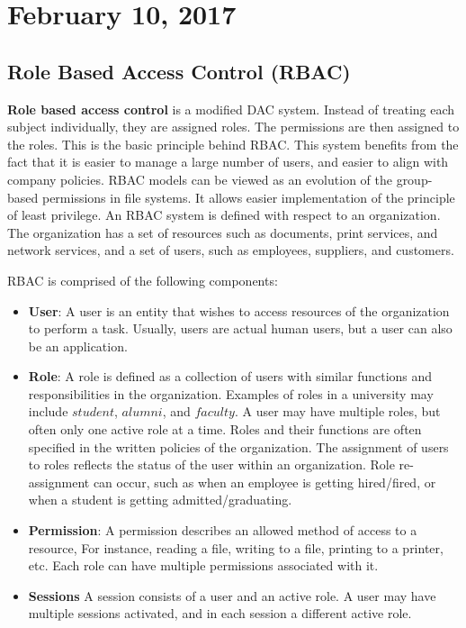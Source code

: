 \documentclass[11pt]{article}
\theoremstyle{plain} %
\theoremstyle{definition}
\theoremstyle{example}
\theoremstyle{remark}
\begin{document}
\section{February 10, 2017}
\subsection{Role Based Access Control (RBAC)}

\textbf{Role based access control} is a modified DAC system. Instead of treating each subject individually, they are assigned roles. The permissions are then assigned to the roles. This is the basic principle behind RBAC. This system benefits from the fact that it is easier to manage a large number of users, and easier to align with company policies. RBAC models can be viewed as an evolution of the group-based permissions in file systems. It allows easier implementation of the principle of least privilege. An RBAC system is defined with respect to an organization.
The organization has a set of resources such as documents, print services, and network services, and a set of users, such as employees, suppliers, and customers.

RBAC is comprised of the following components:
\begin{itemize}
	\item \textbf{User}: A user is an entity that wishes to access resources of the organization to perform a task. Usually, users are actual human users, but a user can also be an application.
	\item \textbf{Role}: A role is defined as a collection of users with similar functions and responsibilities in the organization. Examples of roles in a university may include $student$, $alumni$, and $faculty$. A user may have multiple roles, but often only one active role at a time. Roles and their functions are often specified in the written policies of the organization. The assignment of users to roles reflects the status of the user within an organization. Role re-assignment can occur, such as when an employee is getting hired/fired, or when a student is getting admitted/graduating.
	\item \textbf{Permission}: A permission describes an allowed method of access to a resource, For instance, reading a file, writing to a file, printing to a printer, etc. Each role can have multiple permissions associated with it.
	\item \textbf{Sessions} A session consists of a user and an active role. A user may have multiple sessions activated, and in each session a different active role.
\end{itemize}
\end{document}
